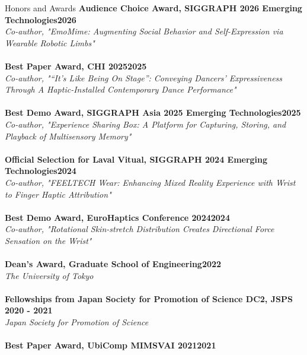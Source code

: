 \documentclass{resume} %
\begin{document}
\begin{rSection}{Honors and Awards}
{\bf Audience Choice Award, SIGGRAPH 2026 Emerging Technologies}\hfill {\bf 2026}
\\{\em Co-author, "EmoMime: Augmenting Social Behavior and Self-Expression via Wearable Robotic Limbs"} \\
\\{\bf Best Paper Award, CHI 2025}\hfill {\bf 2025}
\\{\em Co-author, "“It’s Like Being On Stage”: Conveying Dancers’ Expressiveness Through A Haptic-Installed Contemporary Dance Performance"} \\
\\{\bf Best Demo Award, SIGGRAPH Asia 2025 Emerging Technologies}\hfill {\bf 2025}
\\{\em Co-author, "Experience Sharing Box: A Platform for Capturing, Storing, and Playback of Multisensory Memory"} \\
\\{\bf Official Selection for Laval Vitual, SIGGRAPH 2024 Emerging Technologies}\hfill {\bf 2024}
\\{\em Co-author, "FEELTECH Wear: Enhancing Mixed Reality Experience with Wrist to Finger Haptic Attribution"} \\
\\{\bf Best Demo Award, EuroHaptics Conference 2024}\hfill {\bf 2024}
\\{\em Co-author, "Rotational Skin-stretch Distribution Creates Directional Force Sensation on the Wrist"} \\
\\{\bf Dean's Award, Graduate School of Engineering}\hfill {\bf 2022}
\\{\em The University of Tokyo} \\
\\{\bf Fellowships from Japan Society for Promotion of Science DC2, JSPS} \hfill {\bf 2020 - 2021}
\\{\em Japan Society for Promotion of Science} \\
\vspace{-3mm}
\\{\bf Best Paper Award, UbiComp MIMSVAI 2021}\hfill {\bf 2021}

\end{rSection}
\end{document}
